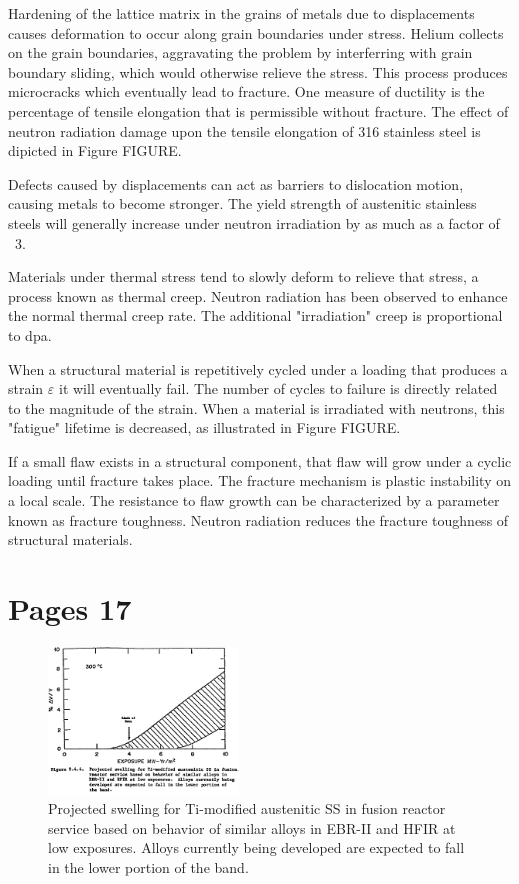 \documentclass[11pt]{article}
\begin{document}
Hardening of the lattice matrix in the grains of metals due to displacements causes deformation to occur along grain boundaries under stress. Helium collects on the grain boundaries, aggravating the problem by interferring with grain boundary sliding, which would otherwise relieve the stress. This process produces microcracks which eventually lead to fracture. One measure of ductility is the percentage of tensile elongation that is permissible without fracture. The effect of neutron radiation damage upon the tensile elongation of 316 stainless steel is dipicted in Figure FIGURE. 

Defects caused by displacements can act as barriers to dislocation motion, causing metals to become stronger. The yield strength of austenitic stainless steels will generally increase under neutron irradiation by as much as a factor of ~3.

Materials under thermal stress tend to slowly deform to relieve that stress, a process known as thermal creep. Neutron radiation has been observed to enhance the normal thermal creep rate. The additional "irradiation" creep is proportional to dpa.

When a structural material is repetitively cycled under a loading that produces a strain $\varepsilon$ it will eventually fail. The number of cycles to failure is directly related to the magnitude of the strain. When a material is irradiated with neutrons, this "fatigue" lifetime is decreased, as illustrated in Figure FIGURE.

If a small flaw exists in a structural component, that flaw will grow under a cyclic loading until fracture takes place. The fracture mechanism is plastic instability on a local scale. The resistance to flaw growth can be characterized by a parameter known as fracture toughness. Neutron radiation reduces the fracture toughness of structural materials.

\section{Pages 17}

\begin{figure}[H]
  \centering
  \includegraphics[width=0.45\textwidth]{figs/fig11.png}
  \caption{Projected swelling for Ti-modified austenitic SS in fusion reactor service based on behavior of similar alloys in EBR-II and HFIR at low exposures. Alloys currently being developed are expected to fall in the lower portion of the band.}
\end{figure}
\end{document}
